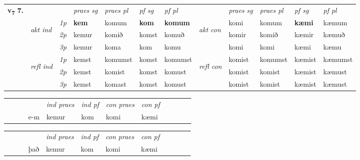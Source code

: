 \begin{tabular}{llllllllllll} \toprule
\multirow{4}{*}{{{\textbf{v{\textsubscript{7}}} \Large{\textbf{7.}}}}}  & &   &  \textit{praes sg}  & \textit{praes pl}  &\textit{ pf sg} & \textit{pf pl} &  &  \textit{praes sg}  & \textit{praes pl}  & \textit{pf sg} & \textit{pf pl } \\*
	\cmidrule{4-7} \cmidrule{9-12}
 & \multirow{3}{*}{\begin{turn}{90}\textit{akt ind}\end{turn}} & {\textit{1p}} & \textbf{kem} & komum    & \textbf{kom} & \textbf{komum} & \multirow{3}{*}{\begin{turn}{90}\textit{akt con}\end{turn}} &komi & komum & \textbf{kæmi} & kæmum\\*
& &  {\textit{2p}} &  kemur  & komið   & komst & komuð & & komir & komið & kæmir & kæmuð \\*
& &  {\textit{3p}} & kemur & koma   & kom & komu & & komi & komi& kæmi & kæmu  \\*
\cmidrule{4-7} \cmidrule{9-12}
 &\multirow{3}{*}{\begin{turn}{90}\textit{refl ind}\end{turn}} & {\textit{1p}} & kemst & komumst    & komst & komumst & \multirow{3}{*}{\begin{turn}{90}\textit{refl con}\end{turn}}  &komist & komumst & kæmist & kæmumst\\*
 &&  {\textit{2p}} &  kemst  & komist   & komst & komust & &komist & komist & kæmist & kæmust \\*
& &  {\textit{3p}} & kemst & komast   & komst & komust & & komist & komist& kæmist & kæmust  \\*
\cmidrule{4-7} \cmidrule{9-12}
\end{tabular}


\begin{tabular}{llllllllllll}
 & &  & &  \textit{ind praes} & \textit{ind pf} & \textit{con praes} & \textit{con pf} \\*
&  & & e-m & kemur & kom & komi & kæmi \\*
\cmidrule{5-9}
\end{tabular}


\begin{tabular}{llllllllllll}
 & &  & &  \textit{ind praes} & \textit{ind pf} & \textit{con praes} & \textit{con pf} \\*
&  & & það & kemur & kom & komi & kæmi \\*
\cmidrule{5-9}
\end{tabular}



